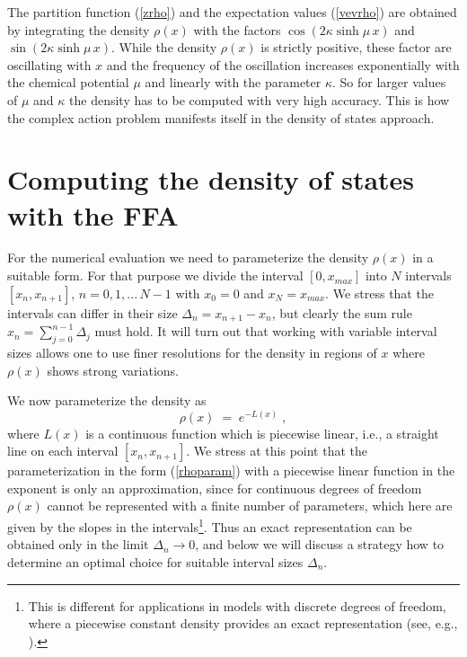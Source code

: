 \documentclass[a4paper,11pt]{article}
\begin{document}
The partition function (\ref{zrho}) and the expectation values (\ref{vevrho}) are obtained by integrating the density 
$\rho(x)$ with the factors $\cos( 2 \kappa \sinh\!  \mu \, x)$ and $\sin( 2 \kappa \sinh\! \mu \, x)$. 
While the density $\rho(x)$ is strictly positive, these factor are oscillating with $x$ and the frequency of the
oscillation increases exponentially with the chemical potential $\mu$  and linearly with the parameter $\kappa$. 
So for larger values of $\mu$ and $\kappa$ the density has to be computed with very high accuracy. 
This is how the complex action problem manifests itself in the density of states approach. 

\section{Computing the density of states with the FFA}

For the numerical evaluation we need to parameterize the density $\rho(x)$ in a suitable form. For that purpose we  
divide the interval $[0, x_{max}]$ into $N$ intervals $[x_n, x_{n+1}]$, 
$n=0,1, ... \, N\!-\!1$ with $x_0 = 0$ and $x_N = x_{max}$. We stress that the intervals can differ in their size 
$\Delta_n = x_{n+1} - x_n$, but clearly the sum rule $x_n = \sum_{j=0}^{n-1} \Delta_j$ must hold. It will turn out that 
working with variable interval sizes allows one to use finer resolutions for the density in regions of $x$ where 
$\rho(x)$ shows strong variations.

We now parameterize the density as 
\begin{equation}
\rho(x) \; = \; e^{-L(x)} \; ,
\label{rhoparam}
\end{equation}
where $L(x)$ is a continuous function which is piecewise linear, 
i.e., a straight line on each interval $[x_n, x_{n+1}]$. We stress at this point that the parameterization 
in the form (\ref{rhoparam}) with a piecewise linear function in the exponent is only an approximation, 
since for continuous degrees of freedom $\rho(x)$ cannot be represented with a finite number of parameters,
which here are given by the slopes in the intervals\footnote{This is different for applications in models
with discrete degrees of freedom, where a piecewise constant density provides an exact representation (see, e.g., 
\cite{Mercado:2014dva,Gattringer:2015lra}).}. Thus an exact representation can be obtained only in the limit 
$\Delta_n \rightarrow 0$, and below we will discuss a strategy how to determine an optimal choice for suitable 
interval sizes $\Delta_n$.
\end{document}

